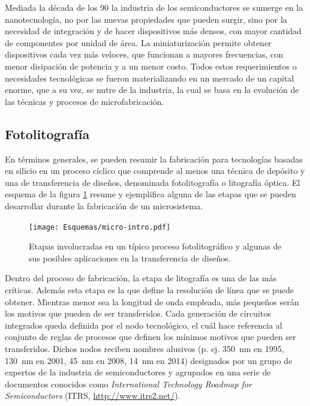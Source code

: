  		Mediada la década de los 90 la industria de los semiconductores se sumerge en la nanotecnología, no por las nuevas propiedades que pueden surgir, sino por la necesidad de integración y de hacer dispositivos más densos, con mayor cantidad de componentes por unidad de área. La miniaturización permite obtener dispositivos cada vez más  veloces, que funcionan a mayores frecuencias, con menor disipación de potencia y a un menor costo. Todos estos requerimientos o necesidades tecnológicas se fueron materializando en un mercado de un capital enorme, que a su vez, se nutre de la industria, la cual se basa en la evolución de las técnicas y procesos de microfabricación.

	\subsection{Fotolitografía}

		En términos generales, se pueden resumir la fabricación para tecnologías basadas en silicio en un proceso cíclico que comprende al menos una técnica de depósito y una de transferencia de diseños, denominada fotolitografía o litografía óptica. El esquema de la figura \ref{fig:micro-intro} resume y ejemplifica alguna de las etapas que se pueden desarrollar durante la fabricación de un microsistema.
		
 			\begin{figure}[b!]
 				\begin{center}
 				\texttt{[image: Esquemas/micro-intro.pdf]}
 				\caption[Etapas de los procesos de microfabricación]{Etapas involucradas en un típico proceso fotolitográfico y algunas de sus posibles aplicaciones en la transferencia de diseños.}
 		   		\label{fig:micro-intro}
 		    	\end{center}
 		    	\end{figure}
	
		Dentro del proceso de fabricación, la etapa de litografía es una de las más críticas. Además esta etapa es la que define la resolución de línea que se puede obtener. Mientras menor sea la longitud de onda empleada, más pequeños serán los motivos que pueden de ser transferidos. Cada generación de circuitos integrados queda definida por el nodo tecnológico, el cuál hace referencia al conjunto de reglas de procesos que definen los mínimos motivos que pueden ser transferidos. Dichos nodos reciben nombres alusivos (p. ej. \SI{350}{nm} en 1995, \SI{130}{nm} en 2001, \SI{45}{nm} en 2008, \SI{14}{nm} en 2014) designados por un grupo de expertos de la industria de semiconductores y agrupados en una serie de documentos conocidos como \textit{International Technology Roadmap for Semiconductors} (ITRS, \url{http://www.itrs2.net/}).\cite{gargini2000}


